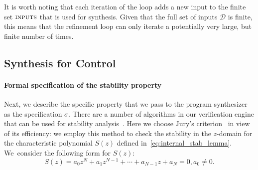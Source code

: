 \documentclass[final]{sig-alternate-05-2015}
\newcommand{\red}[1]{{\color{red}#1}}
\begin{document}

It is worth noting that each iteration of the loop adds a new input to
the finite set $\text{\sc inputs}$ that is used for synthesis.  Given
that the full set of inputs $\mathcal{D}$ is finite, this means that
the refinement loop can only iterate a potentially very large, but
finite number of times.

\subsection{Synthesis for Control}
\label{synthesis-elements}

\paragraph{Formal specification of the stability property}

Next, we describe the specific property that we pass to the program
synthesizer as the specification $\sigma$.  There are a number of 
algorithms in our verification engine that can be used for stability analysis~\cite{daes20161, Bessa16}.  
Here we choose Jury's criterion~\cite{astrom1997computer} in view of its efficiency: 
we employ this method to check the stability in the $z$-domain for the
characteristic polynomial $S(z)$ defined in~\eqref{eq:internal_stab_lemma}.
%
%
We~consider the following form for $S(z)$:
%
\begin{equation*}
S(z) = a_0z^N+a_1z^{N-1}+\cdots+a_{N-1}z+a_N=0, a_0\neq0. 
\end{equation*}
\end{document}
